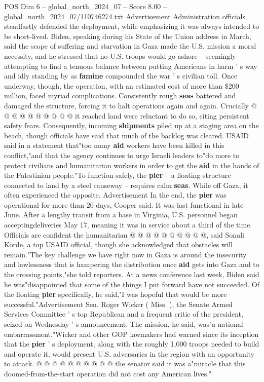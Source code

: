 \begin{textsample}{POS Dim 6 – global\_north\_2024\_07 – Score 8.00 – global\_north\_2024\_07/110746274.txt}
Advertisement Administration officials steadfastly defended the deployment, while emphasizing it was always intended to be short-lived.
Biden, speaking during his State of the Union address in March, said the scope of suffering and starvation in Gaza made the U.S. mission a moral necessity, and he stressed that no U.S. troops would go ashore -- seemingly attempting to find a tenuous balance between putting Americans in harm ' s way and idly standing by as \textbf{famine} compounded the war ' s civilian toll.
Once underway, though, the operation, with an estimated cost of more than \$200 million, faced myriad complications.
Consistently rough \textbf{seas} battered and damaged the structure, forcing it to halt operations again and again.
Crucially @ @ @ @ @ @ @ @ @ @ it reached land were reluctant to do so, citing persistent safety fears.
Consequently, incoming \textbf{shipments} piled up at a staging area on the beach, though officials have said that much of the backlog was cleared.
USAID said in a statement that"too many \textbf{aid} workers have been killed in this conflict,"and that the agency continues to urge Israeli leaders to"do more to protect civilians and humanitarian workers in order to get the \textbf{aid} in the hands of the Palestinian people."To function safely, the \textbf{pier} -- a floating structure connected to land by a steel causeway -- requires calm \textbf{seas}.
While off Gaza, it often experienced the opposite.
Advertisement In the end, the \textbf{pier} was operational for more than 20 days, Cooper said.
It was last functional in late June.
After a lengthy transit from a base in Virginia, U.S. personnel began acceptingdeliveries May 17, meaning it was in service about a third of the time.
Officials are confident the humanitarian @ @ @ @ @ @ @ @ @ @, said Sonali Korde, a top USAID official, though she acknowledged that obstacles will remain."The key challenge we have right now in Gaza is around the insecurity and lawlessness that is hampering the distribution once \textbf{aid} gets into Gaza and to the crossing points,"she told reporters.
At a news conference last week, Biden said he was"disappointed that some of the things I put forward have not succeeded.
Of the floating \textbf{pier} specifically, he said,"I was hopeful that would be more successful."Advertisement Sen.
Roger Wicker ( Miss. ), the Senate Armed Services Committee ' s top Republican and a frequent critic of the president, seized on Wednesday ' s announcement.
The mission, he said, was"a national embarrassment."Wicker and other GOP lawmakers had warned since its inception that the \textbf{pier} ' s deployment, along with the roughly 1,000 troops needed to build and operate it, would present U.S. adversaries in the region with an opportunity to attack. @ @ @ @ @ @ @ @ @ @ the senator said it was a"miracle that this doomed-from-the-start operation did not cost any American lives."

\end{textsample}
